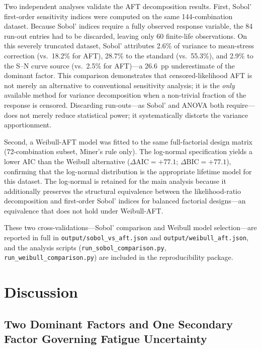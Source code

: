 \documentclass[twocolumn,12pt,a4paper]{article}
\begin{document}
Two independent analyses validate the AFT decomposition results.
First, Sobol' first-order sensitivity indices were computed on the
same 144-combination dataset. Because Sobol' indices require a fully
observed response variable, the 84 run-out entries had to be
discarded, leaving only 60 finite-life observations. On this severely
truncated dataset, Sobol' attributes 2.6\% of variance to mean-stress
correction (vs.\ 18.2\% for AFT), 28.7\% to the standard (vs.\
55.3\%), and 2.9\% to the S--N curve source (vs.\ 2.5\% for
AFT)---a 26.6~pp underestimate of the dominant factor. This comparison demonstrates that
censored-likelihood AFT is not merely an alternative to conventional
sensitivity analysis; it is the \emph{only} available method for
variance decomposition when a non-trivial fraction of the response is
censored. Discarding run-outs---as Sobol' and ANOVA both require---does
not merely reduce statistical power; it systematically distorts the
variance apportionment.

Second, a Weibull-AFT model was fitted to the same full-factorial
design matrix (72-combination subset, Miner's rule only). The
log-normal specification yields a lower AIC than the Weibull
alternative ($\Delta\mathrm{AIC} = +77.1$; $\Delta\mathrm{BIC} =
+77.1$), confirming that the log-normal distribution is the
appropriate lifetime model for this dataset. The log-normal is
retained for the main analysis because it additionally preserves the
structural equivalence between the likelihood-ratio decomposition and
first-order Sobol' indices for balanced factorial designs---an
equivalence that does not hold under Weibull-AFT.

These two cross-validations---Sobol' comparison and Weibull model
selection---are reported in full in \texttt{output/sobol\_vs\_aft.json}
and \texttt{output/weibull\_aft.json}, and the analysis scripts
(\texttt{run\_sobol\_comparison.py}, \texttt{run\_weibull\_comparison.py})
are included in the reproducibility package.

\section{Discussion}
\label{sec:discussion}

\subsection{Two Dominant Factors and One Secondary Factor Governing Fatigue Uncertainty}
\end{document}
